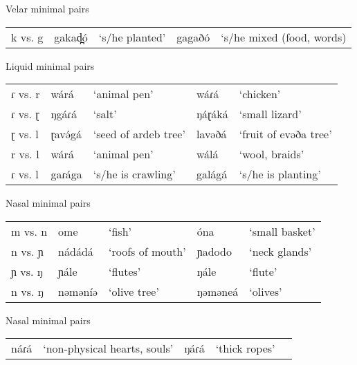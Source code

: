 \ea Velar minimal pairs
\begin{tabular}[t]{lllll}
k vs. g &	gakad̪ó	&‘s/he planted’	&gagaðó	&‘s/he mixed (food, words)
\end{tabular}\label{ex:ch2:45}
\z

			
\ea Liquid minimal pairs
\begin{tabular}[t]{lllll}
ɾ vs. r	&wárá	&‘animal pen’	&wáɾá	&‘chicken’\\
ɾ vs. ɽ	&ŋgáɾá	&‘salt’			&ŋáɽáká	&‘small lizard’\\
ɽ vs. l	&ɽavə́gá	&‘seed of ardeb tree’	&lavəðá	&‘fruit of evəða tree’\\
r vs. l	&wárá	&‘animal pen’	&wálá	&‘wool, braids’\\
ɾ vs. l	&gaɾága	&‘s/he is crawling’	&galágá	&‘s/he is planting’
\end{tabular}\label{ex:ch2:46}
\z 


\ea Nasal minimal pairs
\begin{tabular}[t]{lllll}
m vs. n	&ome	&‘fish’				&óna			&‘small basket’\\
n vs. ɲ	&nádádá	&‘roofs of mouth’	&ɲadodo		&‘neck glands’\\
ɲ vs. ŋ	&ɲále	&‘flutes’			&ŋále		&‘flute’\\
n vs. ŋ	&nəməníə	&‘olive tree’	&ŋəməneá	&‘olives’
\end{tabular}\label{ex:ch2:47}
\z 

\ea Nasal minimal pairs
\begin{tabular}[t]{lllll}
	náɾá	& 	‘non-physical hearts, souls’	 	&	ŋáɾá	&	‘thick ropes’\\
\end{tabular}\label{ex:ch2:48}
\z 
